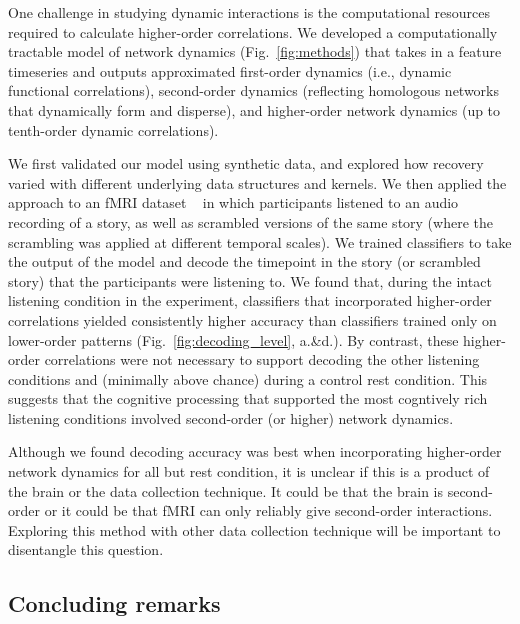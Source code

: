 \documentclass[english]{article}
\begin{document}
One challenge in studying dynamic interactions is the
computational resources required to calculate higher-order correlations. 
We developed a computationally tractable model of network dynamics (Fig.~\ref{fig:methods}) that takes in a feature
timeseries and outputs approximated first-order dynamics (i.e.,
dynamic functional correlations), second-order dynamics
(reflecting homologous networks that dynamically form and disperse),
and higher-order network dynamics (up to tenth-order dynamic
correlations).

We first validated our model using synthetic data, and explored how
recovery varied with different underlying data structures and kernels.   We then 
applied the approach to an fMRI dataset
~\citep{SimoEtal16} in which participants listened to an audio
recording of a story, as well as scrambled versions of the same story
(where the scrambling was applied at different temporal scales).  We
trained classifiers to take the output of the model and decode the
timepoint in the story (or scrambled story) that the participants were
listening to. We found that, during the intact listening condition in the
experiment, classifiers that incorporated higher-order correlations
yielded consistently higher accuracy than classifiers trained only on
lower-order patterns (Fig.~\ref{fig:decoding_level},  a.\&d.).  By contrast, these
higher-order correlations were not necessary to support decoding the other
listening conditions and (minimally
above chance) during a control rest condition.  This suggests
that the cognitive processing that supported the most cogntively rich listening conditions
involved second-order (or higher) network dynamics.

Although we found decoding accuracy was best when incorporating
higher-order network dynamics for all but rest
  condition, it is unclear if this is a product of the brain or the
  data collection technique.  It could be that the brain is
  second-order or it could be that fMRI can
  only reliably give second-order interactions. Exploring this method
  with other data collection technique will be important to
  disentangle this question.



  \subsection*{Concluding remarks}
\end{document}
